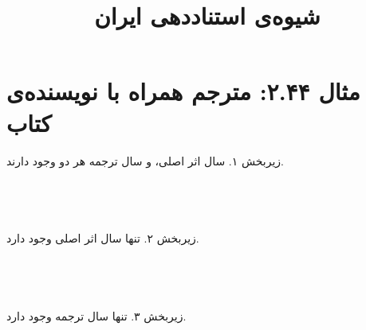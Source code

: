 \documentclass[a4paper,10pt]{article}
\begin{document}
\title{شیوه‌ی استناددهی ایران
 }
\author{}
\date{}
\maketitle



\section*{مثال ۲.۴۴: مترجم همراه با نویسنده‌ی کتاب}

زیربخش ۱. سال اثر اصلی، و سال ترجمه هر دو وجود دارند.\\
\cite{بوسکالیا1978-1}\\
\cite{خوشدل1379-1}\\
\cite{tzu6bc-1}\\
\cite{griffith1963-1}\\


زیربخش ۲. تنها سال اثر اصلی وجود دارد.\\
\cite{بوسکالیا1978-2}\\
\cite{خوشدل1379-2}\\
\cite{tzu6bc-2}\\
\cite{griffith1963-2}\\


زیربخش ۳. تنها سال ترجمه وجود دارد.\\
\cite{بوسکالیا1978-3}\\
\cite{خوشدل1379-3}\\
\cite{tzu6bc-3}\\
\cite{griffith1963-3}\\






\end{document}
